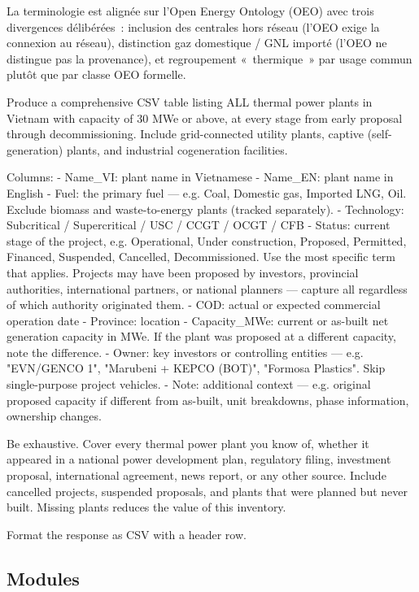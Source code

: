 \medskip
\noindent La terminologie est alignée sur l'Open Energy Ontology (OEO)
avec trois divergences délibérées~: inclusion des centrales hors réseau
(l'OEO exige la connexion au réseau), distinction gaz domestique / GNL
importé (l'OEO ne distingue pas la provenance), et regroupement «~thermique~»
par usage commun plutôt que par classe OEO formelle.

\label{prompt:base}%
\begin{Prompt}
Produce a comprehensive CSV table listing ALL thermal power plants in
Vietnam with capacity of 30 MWe or above, at every stage from early
proposal through decommissioning. Include grid-connected utility plants,
captive (self-generation) plants, and industrial cogeneration facilities.

Columns:
- Name_VI: plant name in Vietnamese
- Name_EN: plant name in English
- Fuel: the primary fuel — e.g. Coal, Domestic gas, Imported LNG, Oil.
  Exclude biomass and waste-to-energy plants (tracked separately).
- Technology: Subcritical / Supercritical / USC / CCGT / OCGT / CFB
- Status: current stage of the project, e.g. Operational, Under
  construction, Proposed, Permitted, Financed, Suspended, Cancelled,
  Decommissioned. Use the most specific term that applies. Projects may
  have been proposed by investors, provincial authorities, international
  partners, or national planners — capture all regardless of which
  authority originated them.
- COD: actual or expected commercial operation date
- Province: location
- Capacity_MWe: current or as-built net generation capacity in MWe.
  If the plant was proposed at a different capacity, note the difference.
- Owner: key investors or controlling entities — e.g. "EVN/GENCO 1",
  "Marubeni + KEPCO (BOT)", "Formosa Plastics". Skip single-purpose
  project vehicles.
- Note: additional context — e.g. original proposed capacity if different
  from as-built, unit breakdowns, phase information, ownership changes.

Be exhaustive. Cover every thermal power plant you know of, whether it
appeared in a national power development plan, regulatory filing,
investment proposal, international agreement, news report, or any other
source. Include cancelled projects, suspended proposals, and plants that
were planned but never built. Missing plants reduces the value of this
inventory.

Format the response as CSV with a header row.
\end{Prompt}

\subsection{Modules}\label{sec:modules}


